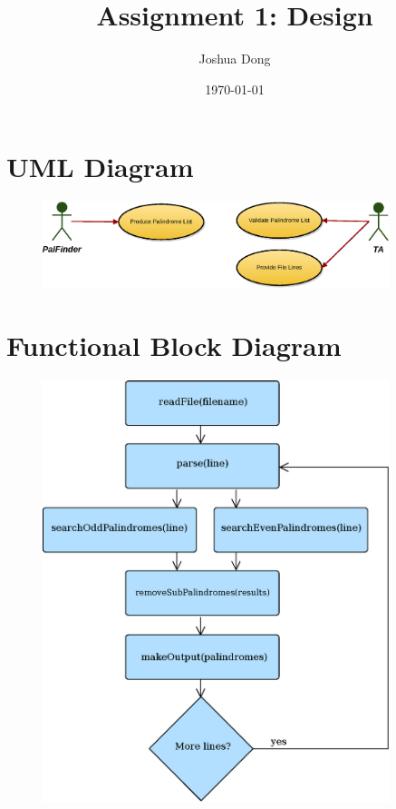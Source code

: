 \documentclass{article}
\begin{document}
\title{\vspace{-60pt}Assignment 1: Design\vspace{-2ex}}
\author{Joshua Dong}
\date{\vspace{-2ex}\today}
\maketitle

\section{UML Diagram}
\vspace{-12pt}
\begin{figure}[h]
  \centering
  \includegraphics[width=0.9\textwidth]{UML.eps}
\end{figure}


\section{Functional Block Diagram}
\vspace{-12pt}
\begin{figure}[h]
  \centering
  \includegraphics[width=0.9\textwidth]{FunctionalBlocks.eps}
  \vspace{-100pt}
\end{figure}
\end{document}
